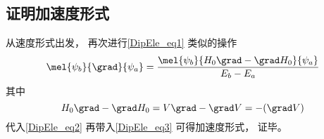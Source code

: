 \subsection{证明加速度形式}
从速度形式出发， 再次进行\autoref{DipEle_eq1} 类似的操作
\begin{equation}\label{DipEle_eq2}
\mel{\psi_b}{\grad}{\psi_a} = \frac{\mel{\psi_b}{H_0\grad - \grad H_0}{\psi_a}}{E_b - E_a}
\end{equation}
其中
\begin{equation}
H_0\grad - \grad H_0 = V\grad - \grad V = -(\grad V)
\end{equation}
代入\autoref{DipEle_eq2} 再带入\autoref{DipEle_eq3} 可得加速度形式， 证毕。
